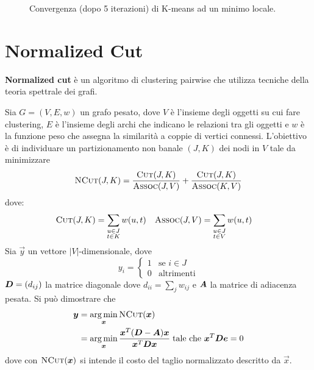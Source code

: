 \begin{figure}[h!]
	\centering
	\caption[Convergenza di K-means]{Convergenza (dopo 5 iterazioni) di K-means ad un minimo locale.}
\end{figure}

\section{Normalized Cut}
\label{sec:normalized_cut}

\textbf{Normalized cut} è un algoritmo di clustering pairwise che utilizza tecniche della teoria spettrale dei grafi.

Sia $G = (V, E, w)$ un grafo pesato, dove $V$ è l'insieme degli oggetti su cui fare clustering, $E$ è l'insieme degli archi che indicano le relazioni tra gli oggetti e $w$ è la funzione peso che assegna la similarità a coppie di vertici connessi. L'obiettivo è di individuare un partizionamento non banale $(J, K)$ dei nodi in $V$ tale da minimizzare
\begin{displaymath}
	\textsc{NCut}(J, K) = \frac{\textsc{Cut}(J, K)}{\textsc{Assoc}(J, V)} + \frac{\textsc{Cut}(J, K)}{\textsc{Assoc}(K, V)}
\end{displaymath}
dove:
\begin{align*}
	\textsc{Cut}(J, K) &= \sum_{\substack{u \in J \\ t \in K}} w(u, t) & \textsc{Assoc}(J, V) &= \sum_{\substack{u \in J \\ t \in V}} w(u, t)
\end{align*}
Sia $\vec{y}$ un vettore $|V|$-dimensionale, dove
\begin{displaymath}
	y_i = \begin{cases}
 		1 & \text{se } i \in J \\
 		0 & \text{altrimenti}
 	\end{cases}
\end{displaymath}
$\mat{D} = (d_{ij})$ la matrice diagonale dove $d_{ii} = \sum_j w_{ij}$ e $\mat{A}$ la matrice di adiacenza pesata. Si può dimostrare che
\begin{align*}
	\vec{y} &= \argmin_{\vec{x}} \textsc{NCut}(\vec{x}) \\
	&= \argmin_{\vec{x}} \frac{\vec{x}^T (\mat{D} - \mat{A}) \vec{x}}{\vec{x}^T \mat{D} \vec{x}} \; \text{tale che } \vec{x}^T \mat{D} \vec{e} = 0
\end{align*}
dove con $\textsc{NCut}(\vec{x})$ si intende il costo del taglio normalizzato descritto da $\vec{x}$.

